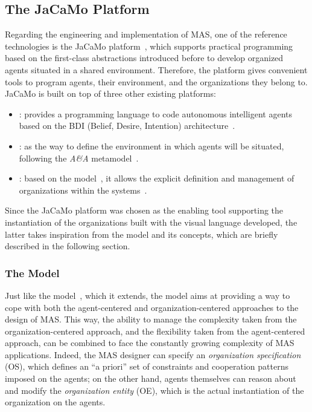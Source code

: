 \subsection{The JaCaMo Platform}
Regarding the engineering and implementation of MAS, one of the reference technologies is the JaCaMo platform~\cite{Boissier2016}, which supports practical programming based on the first-class abstractions introduced before to develop organized agents situated in a shared environment.
Therefore, the platform gives convenient tools to program agents, their environment, and the organizations they belong to.
JaCaMo is built on top of three other existing platforms:
\begin{itemize}
    \item \jason{}: provides a programming language to code autonomous intelligent agents based on the BDI (Belief, Desire, Intention) architecture~\cite{bordini2007programming}\cite{Bratman1987-BRAIPA}.
    \item \cartago{}: as the way to define the environment in which agents will be situated, following the \textit{A\&A} metamodel~\cite{Ricci2009}.
    \item \moise{}: based on the \moiseplus{} model~\cite{10.1145/544741.544858}, it allows the explicit definition and management of organizations within the systems~\cite{doi:10.1504/IJAOSE.2007.016266}.
\end{itemize}

Since the JaCaMo platform was chosen as the enabling tool supporting the instantiation of the organizations built with the visual language developed, the latter takes inspiration from the \moiseplus{} model and its concepts, which are briefly described in the following section.

\subsubsection{The \moiseplus{} Model}
Just like the \moise{} model~\cite{hannoun2000}, which it extends, the \moiseplus{} model aims at providing a way to cope with both the agent-centered and organization-centered approaches to the design of MAS.
This way, the ability to manage the complexity taken from the organization-centered approach, and the flexibility taken from the agent-centered approach, can be combined to face the constantly growing complexity of MAS applications.
Indeed, the MAS designer can specify an \textit{organization specification} (OS), which defines an ``a priori'' set of constraints and cooperation patterns imposed on the agents; on the other hand, agents themselves can reason about and modify the \textit{organization entity} (OE), which is the actual instantiation of the organization on the agents.


